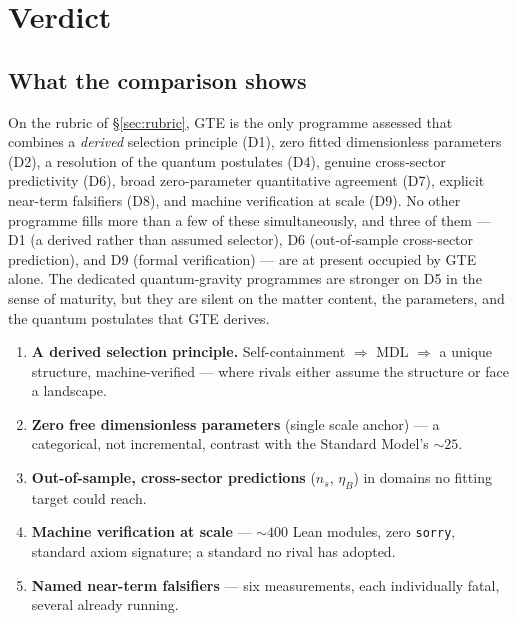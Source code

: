 \documentclass[11pt]{article}
\begin{document}
\section{Verdict}
\label{sec:verdict}

\subsection{What the comparison shows}

On the rubric of §\ref{sec:rubric}, GTE is the only programme assessed that
combines a \emph{derived} selection principle (D1), zero fitted dimensionless
parameters (D2), a resolution of the quantum postulates (D4), genuine cross-sector
predictivity (D6), broad zero-parameter quantitative agreement (D7), explicit
near-term falsifiers (D8), and machine verification at scale (D9).  No other
programme fills more than a few of these simultaneously, and three of them ---
D1 (a derived rather than assumed selector), D6 (out-of-sample cross-sector
prediction), and D9 (formal verification) --- are at present occupied by GTE alone.
The dedicated quantum-gravity programmes are stronger on D5 in the sense of
maturity, but they are silent on the matter content, the parameters, and the
quantum postulates that GTE derives.

\begin{tcolorbox}[colback=green!6,colframe=green!55!black,
  title={The decisive differentiators}]
\small
\begin{enumerate}[leftmargin=1.6em,itemsep=2pt]
\item \textbf{A derived selection principle.}  Self-containment $\Rightarrow$ MDL
  $\Rightarrow$ a unique structure, machine-verified --- where rivals either assume
  the structure or face a landscape.
\item \textbf{Zero free dimensionless parameters} (single scale anchor) --- a
  categorical, not incremental, contrast with the Standard Model's $\sim 25$.
\item \textbf{Out-of-sample, cross-sector predictions} ($n_s$, $\eta_B$) in domains
  no fitting target could reach.
\item \textbf{Machine verification at scale} --- $\sim 400$ Lean modules, zero
  \texttt{sorry}, standard axiom signature; a standard no rival has adopted.
\item \textbf{Named near-term falsifiers} --- six measurements, each individually
  fatal, several already running.
\end{enumerate}
\end{tcolorbox}
\end{document}
